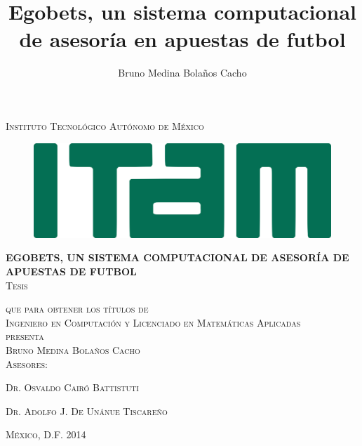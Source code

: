 
\title{Egobets, un sistema computacional de asesoría en apuestas de futbol}
\author{Bruno Medina Bolaños Cacho}

\begin{titlepage}
\begin{center}

\textsc{\Large Instituto Tecnológico Autónomo de México}\\[3em]

\begin{figure}[ht]
\begin{center}
\includegraphics{resources/logo-ITAM}
\end{center}
\end{figure}

\vspace{2em}

\textsc\huge\textbf{EGOBETS, UN SISTEMA COMPUTACIONAL DE ASESORÍA DE APUESTAS DE FUTBOL}\\[3em]


\textsc{\large Tesis}

\textsc{que para obtener los títulos de}\\[1em]

\textsc{Ingeniero en Computación y Licenciado en Matemáticas Aplicadas}\\[1em]

\textsc{presenta}\\[1em]

\textsc{\Large Bruno Medina Bolaños Cacho}\\[1em]

\textsc{\large Asesores:}

\textsc{\large Dr. Osvaldo Cairó Battistuti}

\textsc{\large Dr. Adolfo J. De Unánue Tiscareño}\\[1em]

\end{center}

\vspace*{\fill}
\textsc{México, D.F. \hspace*{\fill} 2014}

\end{titlepage}

